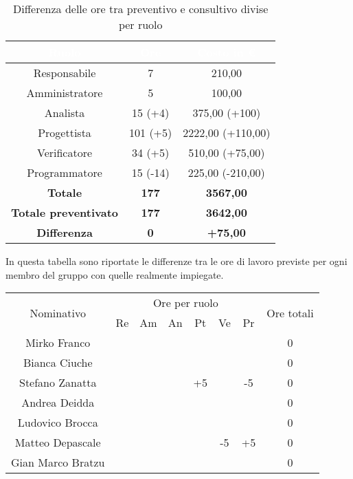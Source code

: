 \begin{flushleft}
	\begin{table}[!h]
	\begin{center}
		\begin{tabular}{ccc}
			\rowcolor{coolblack}
			\hline
			\textcolor{white}{Ruolo} & \textcolor{white}{Ore} & \textcolor{white}{Costo in \euro}\\
			\hline
			Responsabile   & 7   		&  210,00  			 	\\ 
			Amministratore & 5   		&  100,00 			 	\\ 
			Analista       & 15 (+4)	  	&  375,00 (+100)   	\\ 
			Progettista    & 101 (+5)	&  2222,00 (+110,00) 	\\ 
			Verificatore   & 34 (+5)  	&  510,00 (+75,00) 		\\ 
			Programmatore  & 15 (-14)   &  225,00 (-210,00) 	\\ \hline
			\textbf{Totale}& \textbf{177} & \textbf{3567,00}	\\ \hline 
			\textbf{Totale preventivato}& \textbf{177} & \textbf{3642,00}\\ \hline 
			\textbf{Differenza}& \textbf{0} & \textbf{+75,00 }	\\ \hline  
		\end{tabular}
		
		\caption{Differenza delle ore tra preventivo e consultivo divise per ruolo} 
	\end{center}
\end{table}
  \clearpage
  
  In questa tabella  sono riportate le differenze tra le ore di lavoro previste per ogni membro del gruppo con quelle realmente impiegate.\\
  
    \begin{table}[!h]
  	\begin{center}
    \begin{tabularx}{\textwidth}{|c|cccccc|c|}
  			
  	\hline
  	\multirow{2}{*}{Nominativo} & \multicolumn{6}{c|}{Ore per ruolo} & \multirow{2}{*}{Ore totali} \\ \cline{2-7}
  					  & Re & Am & An & Pt & Ve & Pr &      \\ \hline
  	\endhead
  	Mirko Franco       &   &    &    &    &  &   & 0        \\ \hline
  	Bianca Ciuche      &   &    &    &    &  &   & 0        \\ \hline
  	Stefano Zanatta    &   &    &  & +5 &   & -5  & 0        \\ \hline
  	Andrea Deidda      &   &  &   &   &   &   & 0  		\\ \hline
  	Ludovico Brocca    &   &  &   &   &  &   & 0        \\ \hline
  	Matteo Depascale   &   &  &   &   & -5  & +5  & 0  		\\ \hline
  	Gian Marco Bratzu  &   &  &   &   &  &   & 0        \\ \hline
    

\end{tabularx}
\end{center}
\end{table}
\end{flushleft}
